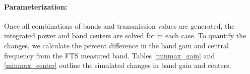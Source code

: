 \FloatBarrier

\paragraph{Parameterization:}
Once all combinations of bands and transmission values are generated, the integrated power and band centers are solved for in each case.  To quantify the changes, we calculate the percent difference in the band gain and central frequency from the FTS measured band.  Tables \ref{minmax_gain} and \ref{minmax_center} outline the simulated changes in band gain and centers.  

\begin{table}[h]
 \centering
\caption{Estimated minimum and maximum percent changes in band gain over a full observing season.}
\label{minmax_gain}
\end{table}


